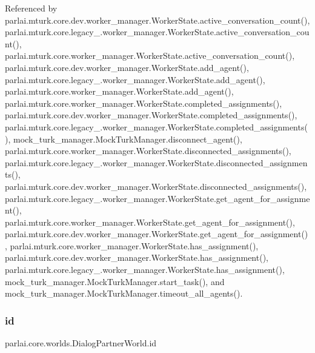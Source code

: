 Referenced by parlai.\+mturk.\+core.\+dev.\+worker\+\_\+manager.\+Worker\+State.\+active\+\_\+conversation\+\_\+count(), parlai.\+mturk.\+core.\+legacy\+\_.\+worker\+\_\+manager.\+Worker\+State.\+active\+\_\+conversation\+\_\+count(), parlai.\+mturk.\+core.\+worker\+\_\+manager.\+Worker\+State.\+active\+\_\+conversation\+\_\+count(), parlai.\+mturk.\+core.\+dev.\+worker\+\_\+manager.\+Worker\+State.\+add\+\_\+agent(), parlai.\+mturk.\+core.\+legacy\+\_.\+worker\+\_\+manager.\+Worker\+State.\+add\+\_\+agent(), parlai.\+mturk.\+core.\+worker\+\_\+manager.\+Worker\+State.\+add\+\_\+agent(), parlai.\+mturk.\+core.\+worker\+\_\+manager.\+Worker\+State.\+completed\+\_\+assignments(), parlai.\+mturk.\+core.\+dev.\+worker\+\_\+manager.\+Worker\+State.\+completed\+\_\+assignments(), parlai.\+mturk.\+core.\+legacy\+\_.\+worker\+\_\+manager.\+Worker\+State.\+completed\+\_\+assignments(), mock\+\_\+turk\+\_\+manager.\+Mock\+Turk\+Manager.\+disconnect\+\_\+agent(), parlai.\+mturk.\+core.\+worker\+\_\+manager.\+Worker\+State.\+disconnected\+\_\+assignments(), parlai.\+mturk.\+core.\+legacy\+\_.\+worker\+\_\+manager.\+Worker\+State.\+disconnected\+\_\+assignments(), parlai.\+mturk.\+core.\+dev.\+worker\+\_\+manager.\+Worker\+State.\+disconnected\+\_\+assignments(), parlai.\+mturk.\+core.\+legacy\+\_.\+worker\+\_\+manager.\+Worker\+State.\+get\+\_\+agent\+\_\+for\+\_\+assignment(), parlai.\+mturk.\+core.\+worker\+\_\+manager.\+Worker\+State.\+get\+\_\+agent\+\_\+for\+\_\+assignment(), parlai.\+mturk.\+core.\+dev.\+worker\+\_\+manager.\+Worker\+State.\+get\+\_\+agent\+\_\+for\+\_\+assignment(), parlai.\+mturk.\+core.\+worker\+\_\+manager.\+Worker\+State.\+has\+\_\+assignment(), parlai.\+mturk.\+core.\+dev.\+worker\+\_\+manager.\+Worker\+State.\+has\+\_\+assignment(), parlai.\+mturk.\+core.\+legacy\+\_.\+worker\+\_\+manager.\+Worker\+State.\+has\+\_\+assignment(), mock\+\_\+turk\+\_\+manager.\+Mock\+Turk\+Manager.\+start\+\_\+task(), and mock\+\_\+turk\+\_\+manager.\+Mock\+Turk\+Manager.\+timeout\+\_\+all\+\_\+agents().

\mbox{\label{classparlai_1_1core_1_1worlds_1_1DialogPartnerWorld_a7b3dc60816b628d1e358521b23d50e2c}} 
\subsubsection{\texorpdfstring{id}{id}}
{\footnotesize\ttfamily parlai.\+core.\+worlds.\+Dialog\+Partner\+World.\+id}



